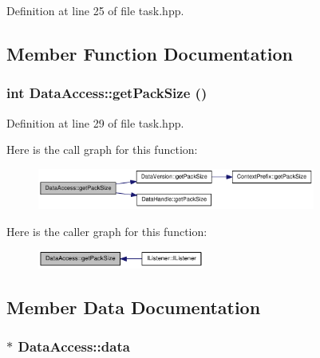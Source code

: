 Definition at line 25 of file task.hpp.

\subsection{Member Function Documentation}
\hypertarget{struct_data_access_a13f389073a0d531058175bd927ca762a}{
\subsubsection[{getPackSize}]{\setlength{\rightskip}{0pt plus 5cm}int DataAccess::getPackSize ()}}
\label{struct_data_access_a13f389073a0d531058175bd927ca762a}


Definition at line 29 of file task.hpp.

Here is the call graph for this function:\nopagebreak
\begin{figure}[H]
\begin{center}
\leavevmode
\includegraphics[width=259pt]{struct_data_access_a13f389073a0d531058175bd927ca762a_cgraph}
\end{center}
\end{figure}


Here is the caller graph for this function:\nopagebreak
\begin{figure}[H]
\begin{center}
\leavevmode
\includegraphics[width=155pt]{struct_data_access_a13f389073a0d531058175bd927ca762a_icgraph}
\end{center}
\end{figure}


\subsection{Member Data Documentation}
\hypertarget{struct_data_access_a870b7cae3b37240d32647683d1fee440}{
\subsubsection[{data}]{$\ast$ {\bf DataAccess::data}}}
\label{struct_data_access_a870b7cae3b37240d32647683d1fee440}


